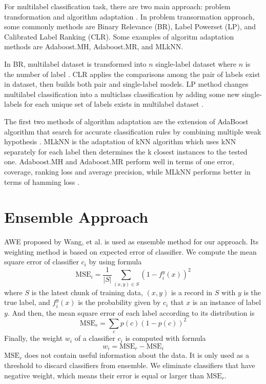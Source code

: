 \documentclass[conference]{IEEEtran}
\begin{document}
For multilabel classification task, there are two main approach: problem transformation and algorithm adaptation \cite{tsoumakas}.
In problem transormation approach, some commonly methods are Binary Relevance (BR), Label Powerset (LP), and Calibrated Label Ranking (CLR).
Some examples of algoritm adaptation methods are Adaboost.MH, Adaboost.MR, and MLkNN.

In BR, multilabel dataset is transformed into $n$ single-label dataset where $n$ is the number of label \cite{prajapati}.
CLR applies the comparisons among the pair of labels exist in dataset, then builds both pair and single-label models.
LP method changes multilabel classification into a multiclass classification \cite{demb} by adding some new single-labels for each unique set of labels exists in multilabel dataset \cite{prajapati}.

The first two methods of algorithm adaptation are the extension of AdaBoost algorithm that search for accurate classification rules by combining multiple weak hypothesis \cite{dharmadhikari}.
MLkNN is the adaptation of kNN algorithm which uses kNN separately for each label then determines the k closest instances to the tested one.
Adaboost.MH and Adaboost.MR perform well in terms of one error, coverage, ranking loss and average precision, while MLkNN performs better in terms of hamming loss \cite{zhang}.

\section{Ensemble Approach}

AWE proposed by Wang, et al. \cite{wang} is used as ensemble method for our approach.
Its weighting method is based on expected error of classifier.
We compute the mean square error of classifier $c_i$ by using formula
\[\text{MSE}_i = \frac{1}{|S|} \sum_{(x,y) \in S} (1 - f_i^y(x))^2\]
where $S$ is the latest chunk of training data, $(x,y)$ is a record in $S$ with $y$ is the true label, and $f_i^y(x)$ is the probability given by $c_i$ that $x$ is an instance of label $y$.
And then, the mean square error of each label according to its distribution is
\[\text{MSE}_r = \sum_{c} p(c)(1-p(c))^2\]
Finally, the weight $w_i$ of a classifier $c_i$ is computed with formula
\[w_i = \text{MSE}_r - \text{MSE}_i\]
$\text{MSE}_r$ does not contain useful information about the data.
It is only used as a threshold to discard classifiers from ensemble.
We eliminate classifiers that have negative weight, which means their error is equal or larger than $\text{MSE}_r$.
\end{document}

